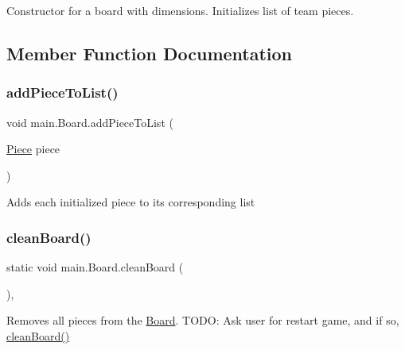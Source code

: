 Constructor for a board with dimensions. Initializes list of team pieces. 

\subsection{Member Function Documentation}
\mbox{\label{classmain_1_1_board_acb48e8218e61ff5504a195bb8634e2d4}} 
\subsubsection{\texorpdfstring{add\+Piece\+To\+List()}{addPieceToList()}}
{\footnotesize\ttfamily void main.\+Board.\+add\+Piece\+To\+List (\begin{DoxyParamCaption}\item[{\hyperlink{classmain_1_1pieces_1_1_piece}{Piece}}]{piece }\end{DoxyParamCaption})\hspace{0.3cm}{\ttfamily [inline]}}

Adds each initialized piece to its corresponding list \mbox{\label{classmain_1_1_board_a47fe4923194507b37829c4c0169e9e62}} 
\subsubsection{\texorpdfstring{clean\+Board()}{cleanBoard()}}
{\footnotesize\ttfamily static void main.\+Board.\+clean\+Board (\begin{DoxyParamCaption}{ }\end{DoxyParamCaption})\hspace{0.3cm}{\ttfamily [inline]}, {\ttfamily [static]}}

Removes all pieces from the \hyperlink{classmain_1_1_board}{Board}. T\+O\+DO\+: Ask user for restart game, and if so, \hyperlink{classmain_1_1_board_a47fe4923194507b37829c4c0169e9e62}{clean\+Board()} \mbox{\label{classmain_1_1_board_a483033056ca4afb113cac5f4ced359fb}} 
